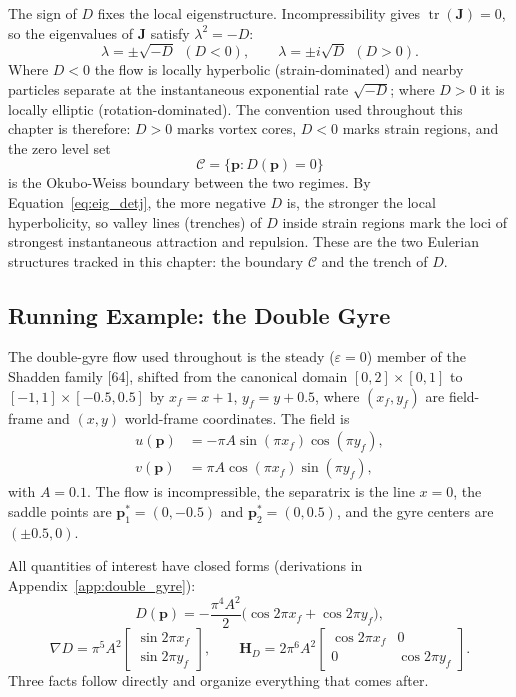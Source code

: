 \documentclass[12pt, letterpaper, oneside]{report}
\begin{document}
The sign of $D$ fixes the local eigenstructure. Incompressibility gives
$\operatorname{tr}(\mathbf{J})=0$, so the eigenvalues of $\mathbf{J}$
satisfy $\lambda^2=-D$:
\begin{equation}
\lambda = \pm\sqrt{-D} \ \ (D<0), \qquad \lambda = \pm i\sqrt{D} \ \ (D>0).
\label{eq:eig_detj}
\end{equation}
Where $D<0$ the flow is locally hyperbolic (strain-dominated) and nearby
particles separate at the instantaneous exponential rate $\sqrt{-D}$; where
$D>0$ it is locally elliptic (rotation-dominated). The convention used
throughout this chapter is therefore: $D>0$ marks vortex cores, $D<0$
marks strain regions, and the zero level set
\begin{equation}
\mathcal{C} = \{\mathbf{p} : D(\mathbf{p})=0\}
\label{eq:ow_boundary}
\end{equation}
is the Okubo-Weiss boundary between the two regimes. By
Equation~\eqref{eq:eig_detj}, the more negative $D$ is, the stronger the
local hyperbolicity, so valley lines (trenches) of $D$ inside strain
regions mark the loci of strongest instantaneous attraction and repulsion.
These are the two Eulerian structures tracked in this chapter: the
boundary $\mathcal{C}$ and the trench of $D$.

\subsection{Running Example: the Double Gyre}
\label{sec:dg_example}

The double-gyre flow used throughout is the steady ($\varepsilon=0$)
member of the Shadden family [64], shifted from the canonical domain
$[0,2]\times[0,1]$ to $[-1,1]\times[-0.5,0.5]$ by $x_f=x+1$, $y_f=y+0.5$,
where $(x_f,y_f)$ are field-frame and $(x,y)$ world-frame coordinates. The
field is
\begin{align}
u(\mathbf{p}) &= -\pi A\sin(\pi x_f)\cos(\pi y_f), \label{eq:dg_u} \\
v(\mathbf{p}) &= \pi A\cos(\pi x_f)\sin(\pi y_f), \label{eq:dg_v}
\end{align}
with $A=0.1$. The flow is incompressible, the separatrix is the line
$x=0$, the saddle points are $\mathbf{p}^*_1=(0,-0.5)$ and
$\mathbf{p}^*_2=(0,0.5)$, and the gyre centers are $(\pm0.5,0)$.

All quantities of interest have closed forms (derivations in
Appendix~\ref{app:double_gyre}):
\begin{equation}
D(\mathbf{p}) = -\frac{\pi^4A^2}{2}\bigl(\cos2\pi x_f + \cos2\pi y_f\bigr),
\label{eq:det_analytic_main}
\end{equation}
\begin{equation}
\nabla D = \pi^5A^2\begin{bmatrix}\sin2\pi x_f\\\sin2\pi y_f\end{bmatrix},
\qquad
\mathbf{H}_D = 2\pi^6A^2\begin{bmatrix}\cos2\pi x_f & 0\\0 & \cos2\pi y_f\end{bmatrix}.
\label{eq:gradhess_analytic_main}
\end{equation}
Three facts follow directly and organize everything that comes after.
\end{document}
